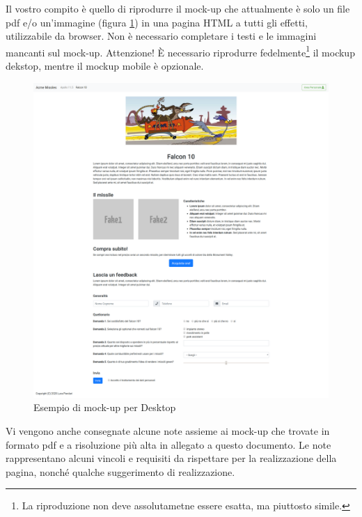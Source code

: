 \documentclass[addpoints,12pt,answers]{exam}
\begin{document}
    Il vostro compito è quello di riprodurre il mock-up che attualmente è solo un file pdf e/o un'immagine (figura \ref{fig:mockup-desktop}) in una pagina HTML a tutti gli effetti, utilizzabile da browser. Non è necessario completare i testi e le immagini mancanti sul mock-up. Attenzione! \`E necessario riprodurre fedelmente\footnote{La riproduzione non deve assolutametne essere esatta, ma piuttosto simile.} il mockup dekstop, mentre il mockup mobile è opzionale.

    \begin{figure}
        \centering
        \includegraphics[scale=0.2]{img/mockup-desktop.png}
        \caption{Esempio di mock-up per Desktop}
        \label{fig:mockup-desktop}
    \end{figure}

    Vi vengono anche consegnate alcune note assieme ai mock-up che trovate in formato pdf e a risoluzione più alta in allegato a questo documento. Le note rappresentano alcuni vincoli e requisiti da rispettare per la realizzazione della pagina, nonché qualche suggerimento di realizzazione.
\end{document}
